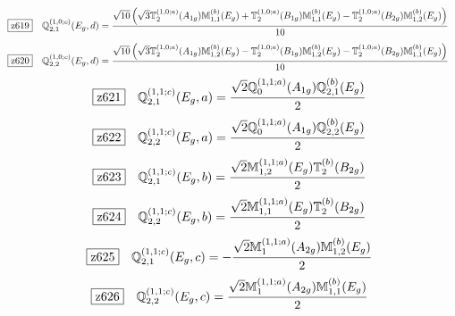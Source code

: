 \documentclass[fleqn,10pt,landscape]{jsarticle}
\begin{document}
\begin{dmath*}
\hspace*{3mm}\fbox{z619}\quad \mathbb{Q}_{2,1}^{(1,0;c)}(E_{g},d)=\frac{\sqrt{10} \left(\sqrt{3} \mathbb{T}_{2}^{(1,0;a)}(A_{1g}) \mathbb{M}_{1,1}^{(b)}(E_{g}) + \mathbb{T}_{2}^{(1,0;a)}(B_{1g}) \mathbb{M}_{1,1}^{(b)}(E_{g}) - \mathbb{T}_{2}^{(1,0;a)}(B_{2g}) \mathbb{M}_{1,2}^{(b)}(E_{g})\right)}{10}
\end{dmath*}
\begin{dmath*}
\hspace*{3mm}\fbox{z620}\quad \mathbb{Q}_{2,2}^{(1,0;c)}(E_{g},d)=\frac{\sqrt{10} \left(\sqrt{3} \mathbb{T}_{2}^{(1,0;a)}(A_{1g}) \mathbb{M}_{1,2}^{(b)}(E_{g}) - \mathbb{T}_{2}^{(1,0;a)}(B_{1g}) \mathbb{M}_{1,2}^{(b)}(E_{g}) - \mathbb{T}_{2}^{(1,0;a)}(B_{2g}) \mathbb{M}_{1,1}^{(b)}(E_{g})\right)}{10}
\end{dmath*}
\begin{dmath*}
\hspace*{3mm}\fbox{z621}\quad \mathbb{Q}_{2,1}^{(1,1;c)}(E_{g},a)=\frac{\sqrt{2} \mathbb{Q}_{0}^{(1,1;a)}(A_{1g}) \mathbb{Q}_{2,1}^{(b)}(E_{g})}{2}
\end{dmath*}
\begin{dmath*}
\hspace*{3mm}\fbox{z622}\quad \mathbb{Q}_{2,2}^{(1,1;c)}(E_{g},a)=\frac{\sqrt{2} \mathbb{Q}_{0}^{(1,1;a)}(A_{1g}) \mathbb{Q}_{2,2}^{(b)}(E_{g})}{2}
\end{dmath*}
\begin{dmath*}
\hspace*{3mm}\fbox{z623}\quad \mathbb{Q}_{2,1}^{(1,1;c)}(E_{g},b)=\frac{\sqrt{2} \mathbb{M}_{1,2}^{(1,1;a)}(E_{g}) \mathbb{T}_{2}^{(b)}(B_{2g})}{2}
\end{dmath*}
\begin{dmath*}
\hspace*{3mm}\fbox{z624}\quad \mathbb{Q}_{2,2}^{(1,1;c)}(E_{g},b)=\frac{\sqrt{2} \mathbb{M}_{1,1}^{(1,1;a)}(E_{g}) \mathbb{T}_{2}^{(b)}(B_{2g})}{2}
\end{dmath*}
\begin{dmath*}
\hspace*{3mm}\fbox{z625}\quad \mathbb{Q}_{2,1}^{(1,1;c)}(E_{g},c)=- \frac{\sqrt{2} \mathbb{M}_{1}^{(1,1;a)}(A_{2g}) \mathbb{M}_{1,2}^{(b)}(E_{g})}{2}
\end{dmath*}
\begin{dmath*}
\hspace*{3mm}\fbox{z626}\quad \mathbb{Q}_{2,2}^{(1,1;c)}(E_{g},c)=\frac{\sqrt{2} \mathbb{M}_{1}^{(1,1;a)}(A_{2g}) \mathbb{M}_{1,1}^{(b)}(E_{g})}{2}
\end{dmath*}
\end{document}

